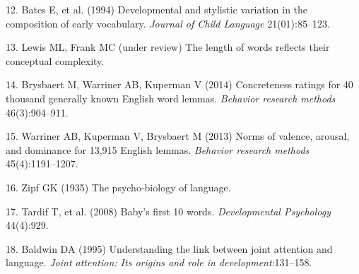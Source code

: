 \documentclass[9pt,twocolumn,twoside]{pnas-new}
\begin{document}
\hypertarget{ref-bates1994}{}
12. Bates E, et al. (1994) Developmental and stylistic variation in the
composition of early vocabulary. \emph{Journal of Child Language}
21(01):85--123.

\hypertarget{ref-lewisunderreview}{}
13. Lewis ML, Frank MC (under review) The length of words reflects their
conceptual complexity.

\hypertarget{ref-brysbaert2014}{}
14. Brysbaert M, Warriner AB, Kuperman V (2014) Concreteness ratings for
40 thousand generally known English word lemmas. \emph{Behavior research
methods} 46(3):904--911.

\hypertarget{ref-warriner2013}{}
15. Warriner AB, Kuperman V, Brysbaert M (2013) Norms of valence,
arousal, and dominance for 13,915 English lemmas. \emph{Behavior
research methods} 45(4):1191--1207.

\hypertarget{ref-zipf1935}{}
16. Zipf GK (1935) The psycho-biology of language.

\hypertarget{ref-tardif2008}{}
17. Tardif T, et al. (2008) Baby's first 10 words. \emph{Developmental
Psychology} 44(4):929.

\hypertarget{ref-baldwin1995}{}
18. Baldwin DA (1995) Understanding the link between joint attention and
language. \emph{Joint attention: Its origins and role in
development}:131--158.



% 
\end{document}
